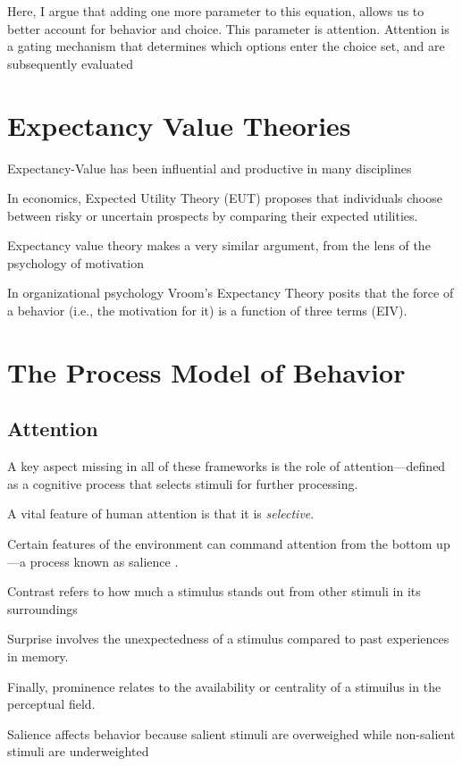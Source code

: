 \documentclass[letterpaper, 12pt]{article}
\begin{document}
Here, I argue that adding one more parameter to this equation, allows us to better account for behavior and choice. This parameter is attention. Attention is a gating mechanism that determines which options enter the choice set, and are subsequently evaluated \cite{berkman2017}
    
\section{Expectancy Value Theories}
    
Expectancy-Value has been influential and productive in many disciplines

In economics, Expected Utility Theory (EUT) proposes that individuals choose between risky or uncertain prospects by comparing their expected utilities.
        
Expectancy value theory makes a very similar argument, from the lens of the psychology of motivation \cite{wigfield2000}
        
In organizational psychology Vroom's Expectancy Theory posits that the force of a behavior (i.e., the motivation for it) is a function of three terms (EIV).

\section{The Process Model of Behavior}

\subsection{Attention}
A key aspect missing in all of these frameworks is the role of attention---defined as a cognitive process that selects stimuli for further processing.

A vital feature of human attention is that it is \textit{selective}.

Certain features of the environment can command attention from the bottom up---a process known as salience \cite{bordalo2022}.

Contrast refers to how much a stimulus stands out from other stimuli in its surroundings

Surprise involves the unexpectedness of a stimulus compared to past experiences in memory.

Finally, prominence relates to the availability or centrality of a stimuilus in the perceptual field.

Salience affects behavior because salient stimuli are overweighed while non-salient stimuli are underweighted
\end{document}
